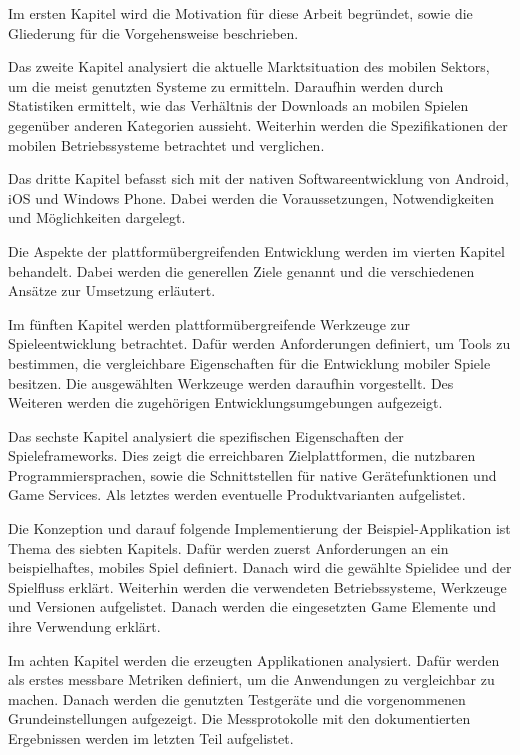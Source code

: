 \bigskip
Im ersten Kapitel wird die Motivation für diese Arbeit begründet, sowie die Gliederung für die Vorgehensweise beschrieben.

\bigskip
Das zweite Kapitel analysiert die aktuelle Marktsituation des mobilen Sektors, um die meist genutzten Systeme zu ermitteln. Daraufhin werden durch Statistiken ermittelt, wie das Verhältnis der Downloads an mobilen Spielen gegenüber anderen Kategorien aussieht. Weiterhin werden die Spezifikationen der mobilen Betriebssysteme betrachtet und verglichen. 

\bigskip
Das dritte Kapitel befasst sich mit der nativen Softwareentwicklung von Android, iOS und Windows Phone. Dabei werden die Voraussetzungen, Notwendigkeiten und Möglichkeiten dargelegt.

\bigskip
Die Aspekte der plattformübergreifenden Entwicklung werden im vierten Kapitel behandelt. Dabei werden die generellen Ziele genannt und die verschiedenen Ansätze zur Umsetzung erläutert. 

\bigskip
Im fünften Kapitel werden plattformübergreifende Werkzeuge zur Spieleentwicklung betrachtet. Dafür werden Anforderungen definiert, um Tools zu bestimmen, die vergleichbare Eigenschaften für die Entwicklung mobiler Spiele besitzen. Die ausgewählten Werkzeuge werden daraufhin vorgestellt. Des Weiteren werden die zugehörigen Entwicklungsumgebungen aufgezeigt. 

\bigskip
Das sechste Kapitel analysiert die spezifischen Eigenschaften der Spieleframeworks. Dies zeigt die erreichbaren Zielplattformen, die nutzbaren Programmiersprachen, sowie die Schnittstellen für native Gerätefunktionen und Game Services. Als letztes werden eventuelle Produktvarianten aufgelistet.

\bigskip
Die Konzeption und darauf folgende Implementierung der Beispiel-Applikation ist Thema des siebten Kapitels. Dafür werden zuerst Anforderungen an ein beispielhaftes, mobiles Spiel definiert. Danach wird die gewählte Spielidee und der Spielfluss erklärt. Weiterhin werden die verwendeten Betriebssysteme, Werkzeuge und Versionen aufgelistet. Danach werden die eingesetzten Game Elemente und ihre Verwendung erklärt.

\bigskip
Im achten Kapitel werden die erzeugten Applikationen analysiert. Dafür werden als erstes messbare Metriken definiert, um die Anwendungen zu vergleichbar zu machen. Danach werden die genutzten Testgeräte und die vorgenommenen Grundeinstellungen aufgezeigt. Die Messprotokolle mit den dokumentierten Ergebnissen werden im letzten Teil aufgelistet.

